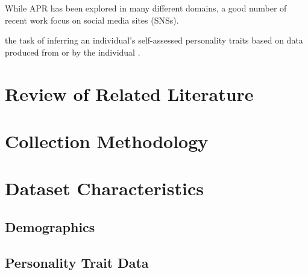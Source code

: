 \documentclass[11pt]{article}
\begin{document}
While APR has been explored in many different domains, a good number of recent work focus on social media sites (SNSs).




the task of inferring an individual's self-assessed personality traits based on data produced from or by the individual \cite{vinciarelli2014survey}. 

\section{Review of Related Literature}

\section{Collection Methodology}

\section{Dataset Characteristics}

\subsection{Demographics}

\subsection{Personality Trait Data}

\subsection{}



\end{document}
